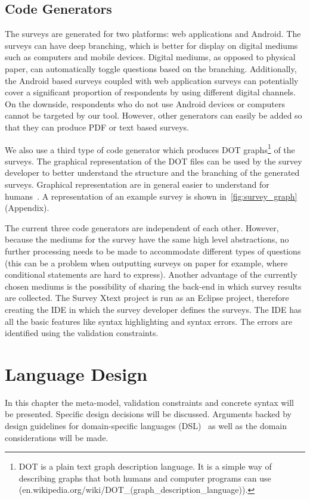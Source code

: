 \documentclass[runningheads,a4paper]{llncs}
\begin{document}
\subsection{Code Generators}
The surveys are generated for two platforms: web applications and Android. The surveys can have deep branching, which is better for display on digital mediums such as computers and mobile devices. Digital mediums, as opposed to physical paper, can automatically toggle questions based on the branching. Additionally, the Android based surveys coupled with web application surveys can potentially cover a significant proportion of respondents by using different digital channels.  On the downside, respondents who do not use Android devices or computers cannot be targeted by our tool. However, other generators can easily be added so that they can produce PDF or text based surveys.

We also use a third type of code generator which produces DOT graphs\footnote{DOT is a plain text graph description language. It is a simple way of describing graphs that both humans and computer programs can use (en.wikipedia.org/wiki/DOT{\_}(graph{\_}description{\_}language)).} of the surveys. The graphical representation of the DOT files can be used by the survey developer to better understand the structure and the branching of the generated surveys. Graphical representation are in general easier to understand for humans~\cite{karsai}. A representation of an example survey is shown in~\ref{fig:survey_graph} (Appendix).

The current three code generators are independent of each other. However, because the mediums for the survey have the same high level abstractions, no further processing needs to be made to accommodate different types of questions (this can be a problem when outputting surveys on paper for example, where conditional statements are hard to express). Another advantage of the currently chosen mediums is the possibility of sharing the back-end in which survey results are collected.
The Survey Xtext project is run as an Eclipse project, therefore creating the IDE in which the survey developer defines the surveys. The IDE has all the basic features like syntax highlighting and syntax errors. The errors are identified using the validation constraints. 

\section{Language Design}
In this chapter the meta-model, validation constraints and concrete syntax will be presented. Specific design decisions will be discussed. Arguments backed by design guidelines for domain-specific languages (DSL)~\cite{karsai} as well as the domain considerations will be made.
\end{document}
